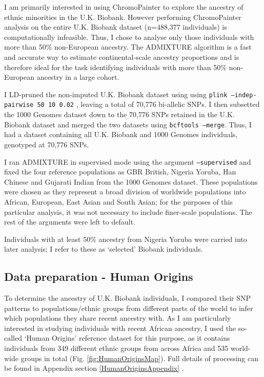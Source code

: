 I am primarily interested in using ChromoPainter \cite{Lawson2012} to explore the ancestry of ethnic minorities in the U.K. Biobank. However performing ChromoPainter analysis on the entire U.K. Biobank dataset (n=488,377 individuals) is computationally infeasible. Thus, I chose to analyse only those individuals with more than 50\% non-European ancestry. The ADMIXTURE algorithm is a fast and accurate way to estimate continental-scale ancestry proportions \cite{alexander2009fast} and is therefore ideal for the task identifying individuals with  more than 50\% non-European ancestry in a large cohort. 

I LD-pruned the non-imputed U.K. Biobank dataset using using \texttt{plink --indep-pairwise 50 10 0.02} \cite{purcell2007plink}, leaving a total of 70,776 bi-allelic SNPs. I then subsetted the 1000 Genomes dataset down to the 70,776 SNPs retained in the U.K. Biobank dataset and merged the two datasets using \texttt{bcftools --merge}. Thus, I had a dataset containing all U.K. Biobank and 1000 Genomes individuals, genotyped at 70,776 SNPs.

I ran ADMIXTURE in supervised mode using the argument \texttt{--supervised} and fixed the four reference populations as GBR British, Nigeria Yoruba, Han Chinese and Gujarati Indian from the 1000 Genomes dataset. These populations were chosen as they represent a broad division of worldwide populations into African, European, East Asian and South Asian; for the purposes of this particular analysis, it was not necessary to include finer-scale populations. The rest of the arguments were left to default.

Individuals with at least 50\% ancestry from Nigeria Yoruba were carried into later analysis; I refer to these as `selected' Biobank individuals.

\subsection{Data preparation - Human Origins}

To determine the ancestry of U.K. Biobank individuals, I compared their SNP patterns to populations/ethnic groups from different parts of the world to infer which populations they share recent ancestry with. As I am particularly interested in studying individuals with recent African ancestry, I used the so-called `Human Origins' reference dataset for this purpose, as it contains individuals from 349 different ethnic groups from across Africa and 535 world-wide groups in total (Fig. \ref{fig:HumanOriginsMap}). Full details of processing can be found in Appendix section \ref{HumanOriginsAppendix} .

